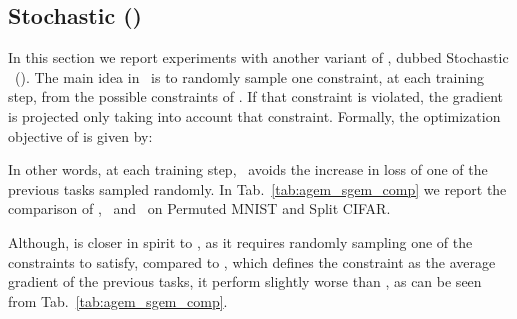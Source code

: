 

\subsection{Stochastic \gem (\mgem)}
\label{sec:supp_stochstc_gem}
In this section we report experiments with another variant of \gem, dubbed Stochastic \gem\ (\mgem). The main idea in \mgem\ is to randomly sample one constraint, 
at each training step, from the possible  constraints of \gem. If that constraint is violated, the gradient is projected only taking into account that 
constraint. Formally, the optimization objective of \mgem is given by:
 

In other words, at each training step, \mgem\ avoids the increase in loss of one of the previous tasks sampled randomly. 
In Tab.~\ref{tab:agem_sgem_comp} we report the comparison of \gem, \mgem\ and \sgem\ on Permuted MNIST and Split CIFAR. 

Although, \mgem is closer in spirit to \gem, as it requires randomly sampling one of the \gem constraints to satisfy, compared to \sgem, which defines the constraint as the average gradient of the previous tasks, it perform slightly worse than \gem, as can be seen from Tab.~\ref{tab:agem_sgem_comp}.

